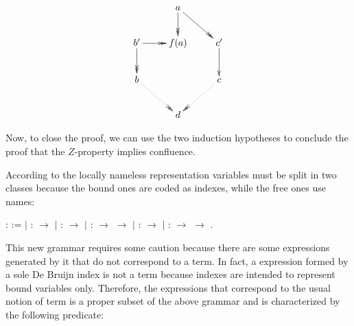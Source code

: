\documentclass{llncs}
\begin{document}
\[
  \xymatrix{
    & a \ar@{->>}[d] \ar@{->>}[rd] \\
    b' \ar@{->>}[r] \ar @{->>}[d] & f(a) & c' \ar [d] \\
    b \ar @{.>>}[dr] & & c \ar@{.>>}[ld] \\
    & d &
  }
\]

Now, to close the proof, we can use the two induction hypotheses to conclude the proof that the $Z$-property implies confluence.

According to the locally nameless representation variables must be split in two classes because the bound ones are coded as indexes, while the free ones use names:

  \begin{coqdoccode}
    \coqdocnoindent {}  :
     :=\coqdoceol \coqdocindent{1.00em} \ensuremath{|}
     :  \ensuremath{\rightarrow}
    \coqdoceol \coqdocindent{1.00em} \ensuremath{|}
     :  \ensuremath{\rightarrow}
    \coqdoceol \coqdocindent{1.00em} \ensuremath{|}
     : 
    \ensuremath{\rightarrow} 
    \ensuremath{\rightarrow} \coqdoceol
    \coqdocindent{1.00em} \ensuremath{|}  :
     \ensuremath{\rightarrow}
    \coqdoceol \coqdocindent{1.00em} \ensuremath{|}
     : 
    \ensuremath{\rightarrow} 
    \ensuremath{\rightarrow} .\coqdoceol
  \end{coqdoccode}

  This new grammar requires some caution because there are some expressions generated by it that do not correspond to a term. In fact, a expression formed by a sole De Bruijn index is not a term because indexes are intended to represent bound variables only. Therefore, the expressions that correspond to the usual notion of term is a proper subset of the above grammar and is characterized by the following predicate:
\end{document}
